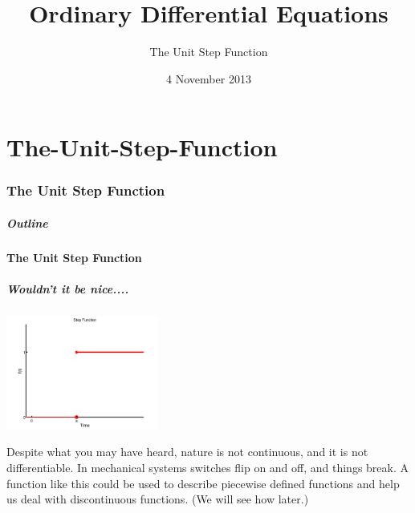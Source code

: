 \part{The-Unit-Step-Function}
\section{The Unit Step Function}

\title{Ordinary Differential Equations}
\subtitle{The Unit Step Function}
\date{4 November 2013}

\begin{frame}
  \titlepage
\end{frame}

\begin{frame}
  \frametitle{Outline}
  \tableofcontents[ currentsection ]
\end{frame}


\subsection{The Unit Step Function}


\begin{frame}
  \frametitle{Wouldn't it be nice....}

  \centerline{\includegraphics[width=5cm]{img/unitStepAta}}

  {%

    Despite what you may have heard, nature is not continuous, and it
    is not differentiable.  In mechanical systems switches flip on and
    off, and things break. A function like this could be used to
    describe piecewise defined functions and help us deal with
    discontinuous functions. (We will see how later.)

  }

\end{frame}

